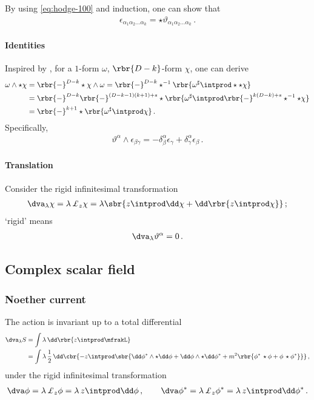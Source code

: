 \documentclass[a4paper]{article}
\begin{document}
By using \cref{eq:hodge-100} and induction, one can show that
\begin{align}
\epsilon_{\alpha_{1}\alpha_{2}\ldots \alpha_{k}} =
\star \vartheta_{\alpha_{1}\alpha_{2}\ldots \alpha_{k}}\,.
\end{align}

\paragraph{Identities}

Inspired by \cite[eq.\ (3.167)]{Straumann2013}, for a $1$-form $\omega$,
$\rbr{D-k}$-form $\chi$, one can derive
\begin{align}
\omega\wedge\star\chi &= \rbr{-}^{D-k}\star\chi\wedge\omega
= \rbr{-}^{D-k} \star^{-1}
	\rbr{\omega^\sharp\intprod\star\star\chi}
\nonumber \\
&= \rbr{-}^{D-k} \rbr{-}^{(D-k-1)(k+1)+s}\star
	\rbr{\omega^\sharp\intprod \rbr{-}^{k(D-k)+s}
		\star^{-1}\star\chi }
\nonumber \\
&= \rbr{-}^{k+1} \star\rbr{\omega^\sharp\intprod \chi }\,.
\end{align}
Specifically,
\begin{align}
\vartheta^{\alpha}\wedge\epsilon_{\beta\gamma}
= -\delta^{\alpha}_{\beta}\epsilon_{\gamma}
	+\delta^{\alpha}_{\gamma}\epsilon_{\beta}\,.
\end{align}

\paragraph{Translation}

Consider the rigid infinitesimal transformation
\begin{align}
\dva_{\lambda}\chi = \lambda\, \pounds_z \chi =
	\lambda\sbr{z\intprod\dd\chi + \dd\rbr{z\intprod\chi}}\,;
\end{align}
`rigid' means
\begin{align}
\dva_{\lambda} \vartheta^{\alpha} = 0\,.
\end{align}


\subsection{Complex scalar field}

\subsubsection{Noether current}
The action is invariant up to a total differential
\begin{align}
\dva_{\lambda} S &= \int \lambda\,\dd\rbr{z \intprod \mfrakL}
\nonumber \\
&= \int \lambda\,\frac{1}{2}\,\dd\cbr{
	- z\intprod\sbr{\dd\phi^*\wedge\star\dd\phi +
	\dd\phi\wedge\star\dd\phi^* +
	m^2\rbr{\phi^*\,\star\phi
	+\phi\,\star\phi^*}}}\,,
\end{align}
under the rigid infinitesimal transformation
\begin{align}
\dva\phi = \lambda\, \pounds_z \phi = \lambda\, z \intprod \dd \phi\,,\qquad
\dva\phi^* = \lambda\, \pounds_z \phi^* = \lambda\, z \intprod \dd \phi^*\,.
\end{align}
\end{document}
